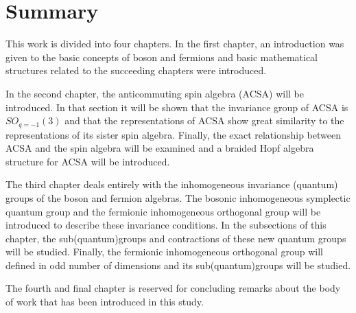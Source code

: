 \section{Summary}

This work is divided into four chapters. In the first chapter, an introduction was given to
the basic concepts of boson and fermions and basic mathematical structures related to the
succeeding chapters were introduced.

In the second chapter, the anticommuting spin algebra (ACSA) will be introduced. In that section
it will be shown that the invariance group of ACSA is $SO_{q = -1}(3)$ and that the representations
of ACSA show great similarity to the representations of its sister spin algebra. Finally, the exact
relationship between ACSA and the spin algebra will be examined and a braided Hopf algebra structure
for ACSA will be introduced.

The third chapter deals entirely with the inhomogeneous invariance (quantum) groups of the
boson and fermion algebras. The bosonic inhomogeneous symplectic quantum group and the
fermionic inhomogeneous orthogonal group will be introduced to describe these invariance
conditions. In the subsections of this chapter, the sub(quantum)groups and contractions of
these new quantum groups will be studied. Finally, the fermionic inhomogeneous orthogonal
group will defined in odd number of dimensions and its sub(quantum)groups will be studied.

The fourth and final chapter is reserved for concluding remarks about the body of work that
has been introduced in this study.

